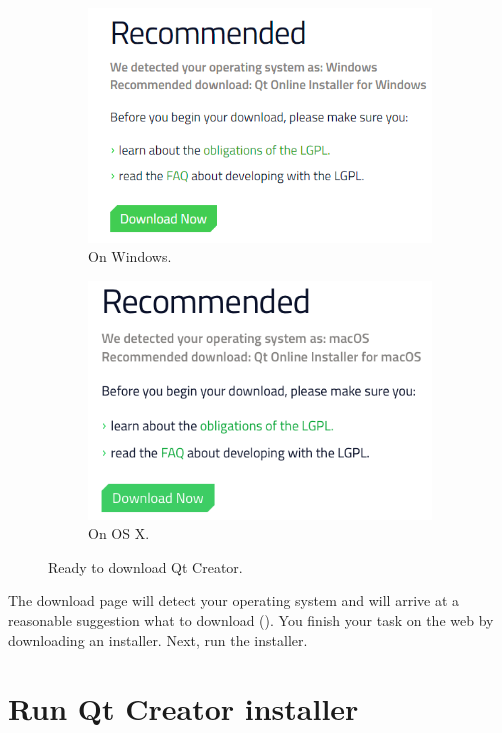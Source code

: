 \begin{figure} %
\centering
\begin{subfigure}{.5\textwidth}
  \centering
  \includegraphics[width=.9\textwidth]{graphics/qt-io-5-win.png}
  \caption{On Windows.}
\end{subfigure}%
\begin{subfigure}{.5\textwidth}
  \centering
  \includegraphics[width=.9\textwidth]{graphics/qt-io-5-osx.png}
  \caption{On OS X.}
\end{subfigure}
\caption{Ready to download Qt Creator.}
\label{fig:qt-recommended}
\end{figure}

The download page will detect your operating system and will arrive at a reasonable suggestion what to download (). You finish your task on the web by downloading an installer. Next, run the installer.

\section{Run Qt Creator installer}

